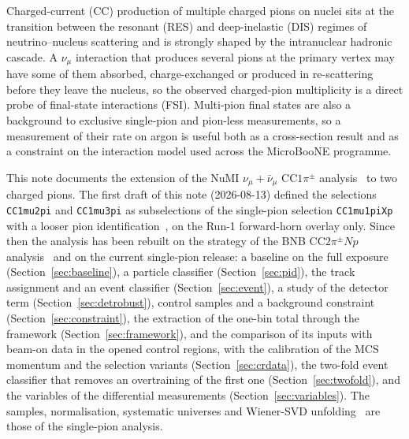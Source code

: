 \documentclass[11pt,a4paper]{article}
\newcommand{\uboone}{MicroBooNE}
\begin{document}
Charged-current (CC) production of multiple charged pions on nuclei sits at the transition between
the resonant (RES) and deep-inelastic (DIS) regimes of neutrino--nucleus scattering and is strongly
shaped by the intranuclear hadronic cascade. A $\nu_\mu$ interaction that produces several pions at
the primary vertex may have some of them absorbed, charge-exchanged or produced in re-scattering
before they leave the nucleus, so the observed charged-pion multiplicity is a direct probe of
final-state interactions (FSI). Multi-pion final states are also a background to exclusive
single-pion and pion-less measurements, so a measurement of their rate on argon is useful both as a
cross-section result and as a constraint on the interaction model used across the \uboone{}
programme.

This note documents the extension of the NuMI $\nu_\mu+\bar\nu_\mu$ CC$1\pi^\pm$
analysis~\cite{note1} to two charged pions. The first draft of this note (2026-08-13) defined the
selections \texttt{CC1mu2pi} and \texttt{CC1mu3pi} as subselections of the single-pion selection
\texttt{CC1mu1piXp} with a looser pion identification~\cite{mahmud,gu}, on the Run-1 forward-horn
overlay only. Since then the analysis has been rebuilt on the strategy of the BNB CC$2\pi^\pm Np$
analysis~\cite{majeed} and on the current single-pion release: a baseline on the full exposure
(Section~\ref{sec:baseline}), a particle classifier (Section~\ref{sec:pid}), the track assignment and
an event classifier (Section~\ref{sec:event}), a study of the detector term
(Section~\ref{sec:detrobust}), control samples and a background constraint
(Section~\ref{sec:constraint}), the extraction of the one-bin total through the framework
(Section~\ref{sec:framework}), and the comparison of its inputs with beam-on data in the opened control
regions, with the calibration of the MCS momentum and the selection variants (Section~\ref{sec:crdata}), the two-fold
event classifier that removes an overtraining of the first one (Section~\ref{sec:twofold}), and the variables of the
differential measurements (Section~\ref{sec:variables}). The
samples, normalisation, systematic universes and Wiener-SVD
unfolding~\cite{wsvd} are those of the single-pion analysis.
\end{document}
